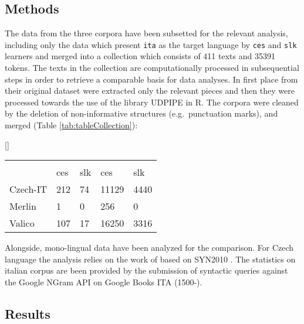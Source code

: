 \documentclass[a4paper,twoside,12pt,chapterprefix=false,listof=flat]{scrartcl}
\makeatletter
\renewenvironment{table}[1][\fps@table]{
  \edef\@tempa{\noexpand\@float{table}[#1]} 
  \@tempa
  \sffamily
  \footnotesize
}{
  \end@float
}
\theoremstyle{plain} %
\theoremstyle{definition}
\theoremstyle{remark}
\makeatother
\begin{document}
\hypertarget{methods}{%
\subsection{Methods}\label{methods}}

The data from the three corpora have been subsetted for the relevant
analysis, including only the data which present \texttt{ita} as the
target language by \texttt{ces} and \texttt{slk} learners and merged
into a collection which consists of 411 texts and 35391 tokens. The
texts in the collection are computationally processed in subsequential
steps in order to retrieve a comparable basis for data analyses. In
first place from their original dataset were extracted only the relevant
pieces and then they were processed towards the use of the library
UDPIPE \citep{udpipe2017} in R. The corpora were cleaned by the deletion
of non-informative structures (e.g.~punctuation marks), and merged
(Table \ref{tab:tableCollection}):

\begin{table}

\caption{\label{tab:tableCollection}\label{tab:tableCollection}Structure of data in the collection}
\centering
\begin{tabu} to 
\toprule
{} &  &  \\
\cmidrule(l{2pt}r{2pt}){2-3} \cmidrule(l{2pt}r{2pt}){4-5}
  & ces & slk & ces & slk\\
\midrule
Czech-IT & 212 & 74 & 11129 & 4440\\
Merlin & 1 & 0 & 256 & 0\\
Valico & 107 & 17 & 16250 & 3316\\
\bottomrule
\end{tabu}
\end{table}

Alongside, mono-lingual data have been analyzed for the comparison. For
Czech language the analysis relies on the work of \citep{veselovska2014}
based on SYN2010 \citep{syn2010}. The statistics on italian corpus are
been provided by the submission of syntactic queries against the Google
NGram API \citep{ngram2011} on Google Books ITA (1500-).

\hypertarget{results}{%
\subsection{Results}\label{results}}
\end{document}
